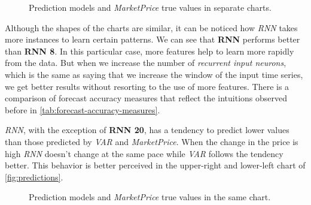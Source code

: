 \begin{figure}[bth]
  \caption{Prediction models and \textit{MarketPrice} true values in
    separate charts.}
  \label{fig:predictions-subplots}
\end{figure}

Although the shapes of the charts are similar, it can be noticed how
\textit{RNN} takes more instances to learn certain patterns. We can
see that \textbf{RNN} performs better than \textbf{RNN 8}. In this
particular case, more features help to learn more rapidly from the
data. But when we increase the number of \textit{recurrent input
neurons}, which is the same as saying that we increase the window of
the input time series, we get better results without resorting to the
use of more features. There is a comparison of forecast accuracy
measures that reflect the intuitions observed before in
\autoref{tab:forecast-accuracy-measures}.

\textit{RNN}, with the exception of \textbf{RNN 20}, has a tendency to
predict lower values than those predicted by \textit{VAR} and
\textit{MarketPrice}. When the change in the price is high
\textit{RNN} doesn't change at the same pace while \textit{VAR}
follows the tendency better. This behavior is better perceived in the
upper-right and lower-left chart of \autoref{fig:predictions}.

\begin{figure}[bth]
  \caption{Prediction models and \textit{MarketPrice} true values in
    the same chart.}
  \label{fig:predictions}
\end{figure}

